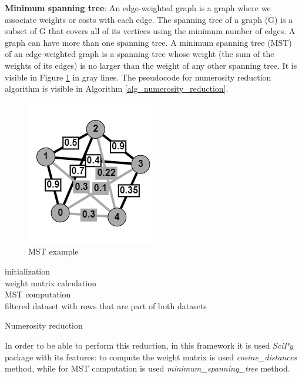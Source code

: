 \documentclass[\main/main.tex]{subfiles}
\begin{document}
\textbf{Minimum spanning tree}: An edge-weighted graph is a graph where we associate weights or costs with each edge. The spanning tree of a graph (G) is a subset of G that covers all of its vertices using the minimum number of edges. A graph can have more than one spanning tree. A minimum spanning tree (MST) \cite{books/daglib/0029345} of an edge-weighted graph is a spanning tree whose weight (the sum of the weights of its edges) is no larger than the weight of any other spanning tree. It is visible in Figure \ref{fig:mst_example} in gray lines. The pseudocode for numerosity reduction algorithm is visible in Algorithm \ref{alg_numerosity_reduction}.
\begin{center}
    \begin{figure}[h]
    \centering
    \includegraphics[scale=1.25]{images/methods/mst_example.png}
    \caption{MST example}
    \label{fig:mst_example}
\end{figure}
\end{center}
\begin{center}
    \begin{algorithm}[H]
     initialization \\
     weight matrix calculation \\
     MST computation \\
     \Return filtered dataset with rows that are part of both datasets
     \caption{Numerosity reduction}
     \label{alg_numerosity_reduction}
    \end{algorithm}
\end{center}
In order to be able to perform this reduction, in this framework it is used \emph{SciPy} \cite{2020SciPyNMeth} package with its features: to compute the weight matrix is used \emph{cosine\_distances} method, while for MST computation is used \emph{minimum\_spanning\_tree} method.
\end{document}
